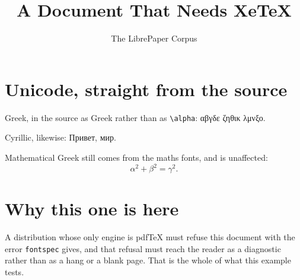 \documentclass[11pt]{article}
\title{A Document That Needs XeTeX}
\author{The LibrePaper Corpus}
\date{}
\begin{document}
\maketitle

\section{Unicode, straight from the source}

Greek, in the source as Greek rather than as \verb|\alpha|: αβγδε ζηθικ λμνξο.

Cyrillic, likewise: Привет, мир.

Mathematical Greek still comes from the maths fonts, and is unaffected:
\begin{equation}
  \alpha^{2} + \beta^{2} = \gamma^{2}.
\end{equation}

\section{Why this one is here}

A distribution whose only engine is pdfTeX must refuse this document with the
error \verb|fontspec| gives, and that refusal must reach the reader as a
diagnostic rather than as a hang or a blank page. That is the whole of what
this example tests.
\end{document}
